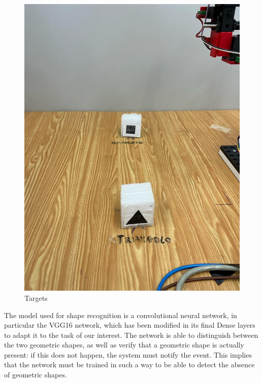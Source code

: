 \documentclass[a4paper,11pt]{report}
\theoremstyle{definition}
\theoremstyle{plain}
\begin{document}
            \begin{figure}[H] %
                \includegraphics[scale=0.3]{images/targets.jpeg}
                \centering
                \caption{Targets}
            \end{figure}
            The model used for shape recognition is a convolutional neural network, in particular the VGG16 network, which has been modified in its final Dense layers to adapt it to the task of our interest. The network is able to distinguish between the two geometric shapes, as well as verify that a geometric shape is actually present: if this does not happen, the system must notify the event. This implies that the network must be trained in such a way to be able to detect the absence of geometric shapes.
\end{document}
